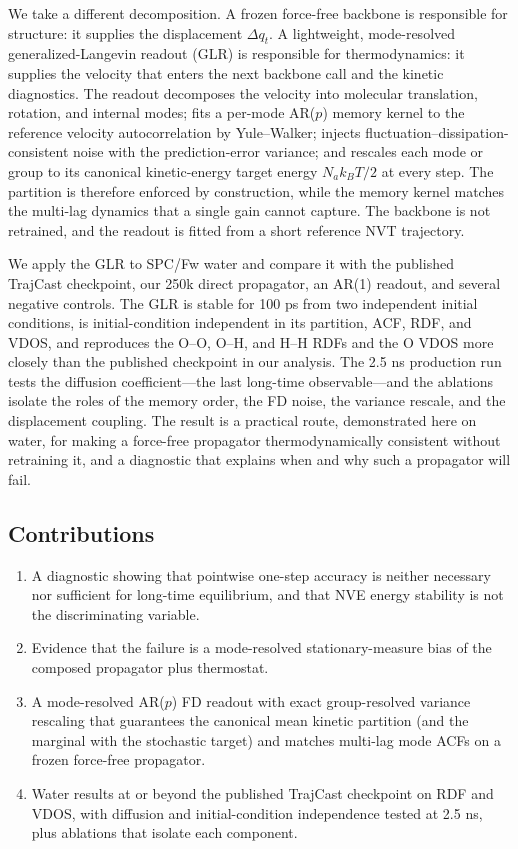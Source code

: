We take a different decomposition. A frozen force-free backbone is responsible for structure: it
supplies the displacement \(\Delta q_t\). A lightweight, mode-resolved generalized-Langevin
readout (GLR) is responsible for thermodynamics: it supplies the velocity that enters the next
backbone call and the kinetic diagnostics. The readout decomposes the velocity into molecular
translation, rotation, and internal modes; fits a per-mode AR(\(p\)) memory kernel to the
reference velocity autocorrelation by Yule--Walker; injects fluctuation--dissipation-consistent
noise with the prediction-error variance; and rescales each mode or group to its canonical kinetic-energy target
energy \(N_a k_B T/2\) at every step. The partition is therefore enforced by construction, while
the memory kernel matches the multi-lag dynamics that a single gain cannot capture. The backbone
is not retrained, and the readout is fitted from a short reference NVT trajectory.

We apply the GLR to SPC/Fw water \cite{spcfw} and compare it with the published TrajCast
checkpoint, our 250k direct propagator, an AR(1) readout, and several negative controls. The GLR
is stable for 100 ps from two independent initial conditions, is initial-condition independent in
its partition, ACF, RDF, and VDOS, and reproduces the O--O, O--H, and H--H RDFs and the O VDOS
more closely than the published checkpoint in our analysis. The 2.5 ns production run tests the
diffusion coefficient---the last long-time observable---and the ablations isolate the roles of
the memory order, the FD noise, the variance rescale, and the displacement coupling. The result is
a practical route, demonstrated here on water, for making a force-free propagator
thermodynamically consistent without retraining it, and a diagnostic that explains when and why
such a propagator will fail.

\subsection*{Contributions}

\begin{enumerate}
\item A diagnostic showing that pointwise one-step accuracy is neither necessary nor sufficient
  for long-time equilibrium, and that NVE energy stability is not the discriminating variable.
\item Evidence that the failure is a mode-resolved stationary-measure bias of the composed
  propagator plus thermostat.
\item A mode-resolved AR(\(p\)) FD readout with exact group-resolved variance rescaling that
  guarantees the canonical mean kinetic partition (and the marginal with the stochastic target)
  and matches multi-lag mode ACFs on a frozen force-free
  propagator.
\item Water results at or beyond the published TrajCast checkpoint on RDF and VDOS, with diffusion
  and initial-condition independence tested at 2.5 ns, plus ablations that isolate each component.
\end{enumerate}
